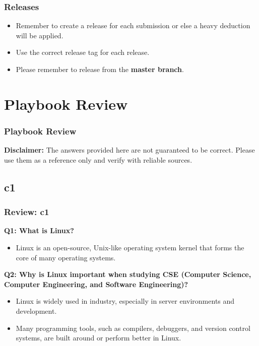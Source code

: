 \documentclass[
	11pt, %
]{beamer}
\begin{document}
\begin{frame}
	\frametitle{Releases}
 
	\begin{itemize}
    \item Remember to create a release for each submission or else a heavy deduction will be applied.
    \item Use the correct release tag for each release.
    \item Please remember to release from the \textbf{master branch}.
\end{itemize}

\end{frame}


\section{Playbook Review}

\begin{frame}
	\frametitle{Playbook Review}

	\textbf{Disclaimer:} The answers provided here are not guaranteed to be correct. Please use them as a reference only and verify with reliable sources.


\end{frame}


\subsection{c1}

\begin{frame}
	\frametitle{Review: c1}

	\textbf{Q1: What is Linux?}

	\begin{itemize}
	    \item Linux is an open-source, Unix-like operating system kernel that forms the core of many operating systems.
	\end{itemize}

	\vspace{0.5cm}
	
	\textbf{Q2: Why is Linux important when studying CSE (Computer Science, Computer Engineering, and Software Engineering)?}

	\begin{itemize}
	    \item Linux is widely used in industry, especially in server environments and development.
	    \item Many programming tools, such as compilers, debuggers, and version control systems, are built around or perform better in Linux.
	\end{itemize}

\end{frame}
\end{document}
